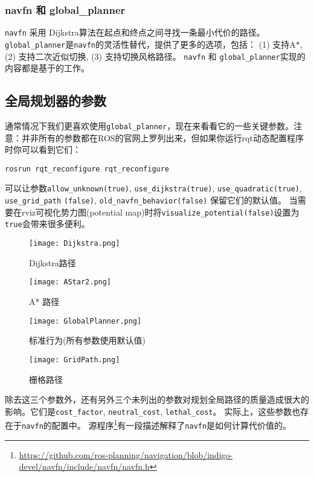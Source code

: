 \subsubsection[navfn and global\_planner]{navfn 和 global\_planner}

\texttt{navfn} 采用 Dijkstra算法在起点和终点之间寻找一条最小代价的路径。
\texttt{global_planner}是\texttt{navfn}的灵活性替代，提供了更多的选项，包括：
(1) 支持A$*$, (2) 支持二次近似切换, (3) 支持切换风格路径。
\texttt{navfn} 和 \texttt{global_planner}实现的内容都是基于\cite{brock1999high}的工作。

\subsection[Global Planner Parameters]{全局规划器的参数}

通常情况下我们更喜欢使用\texttt{global_planner}，现在来看看它的一些关键参数。注意：并非所有的参数都在ROS的官网上罗列出来，但如果你运行rqt动态配置程序时你可以看到它们：
\begin{verbatim}
rosrun rqt_reconfigure rqt_reconfigure
\end{verbatim}
可以让参数\texttt{allow_unknown(true)}, \texttt{use_dijkstra(true)},  \texttt{use_quadratic(true)},  \texttt{use_grid_path} \texttt{(false)},  \texttt{old_navfn_behavior(false)} 保留它们的默认值。
当需要在rviz可视化势力图(potential map)时将\texttt{visualize_potential(false)}设置为\texttt{true}会带来很多便利。

\begin{figure}[!htb]
	\texttt{[image: Dijkstra.png]}
	\caption{Dijkstra路径}
	\endminipage\hfill
	\texttt{[image: AStar2.png]}
	\caption{A* 路径}
	\endminipage\hfill
\end{figure}

\begin{figure}[!htb]
	\texttt{[image: GlobalPlanner.png]}
	\caption{标准行为(所有参数使用默认值)}
	\endminipage\hfill
	\texttt{[image: GridPath.png]}
	\caption{栅格路径}
	\endminipage\hfill
\end{figure}

除去这三个参数外，还有另外三个未列出的参数对规划全局路径的质量造成很大的影响。它们是\texttt{cost_factor}, \texttt{neutral_cost}, \texttt{lethal_cost}。
实际上，这些参数也存在于\texttt{navfn}的配置中。
源程序\footnote{\scriptsize\url{https://github.com/ros-planning/navigation/blob/indigo-devel/navfn/include/navfn/navfn.h}}有一段描述解释了\texttt{navfn}是如何计算代价值的。

